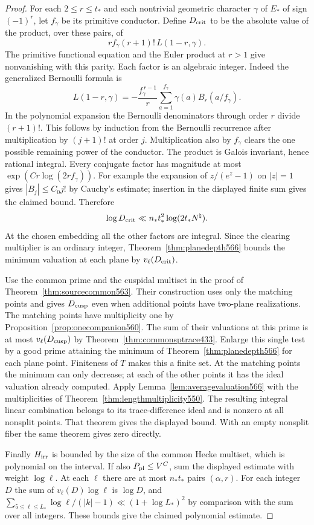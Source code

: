 \documentclass[a4paper,11pt]{article}
\theoremstyle{definition}
\theoremstyle{remark}
\numberwithin{equation}{section}
\begin{document}
\begin{proof}
For each \(2\le r\le t_*\) and each nontrivial geometric
character \(\gamma\) of \(E_*\) of sign \((-1)^r\), let
\(f_\gamma\) be its primitive conductor. Define \(D_{\rm crit}\)
to be the absolute value of the product, over these pairs, of
\[
                  r f_\gamma(r+1)!\,L(1-r,\gamma).
\]
The primitive functional equation and the Euler product at
\(r>1\) give nonvanishing with this parity. Each factor is an
algebraic integer. Indeed the generalized Bernoulli formula is
\[
       L(1-r,\gamma)=
       -\frac{f_\gamma^{\,r-1}}{r}
               \sum_{a=1}^{f_\gamma}\gamma(a)B_r(a/f_\gamma).
\]
In the polynomial expansion the Bernoulli denominators through
order \(r\) divide \((r+1)!\). This follows by induction from
the Bernoulli recurrence after multiplication by \((j+1)!\)
at order \(j\). Multiplication also by \(f_\gamma\) clears
the one possible remaining power of the conductor. The product
is Galois invariant, hence rational integral. Every conjugate
factor has magnitude at most \(\exp(Cr\log(2rf_\gamma))\).
For example the expansion of \(z/(e^z-1)\) on \(|z|=1\)
gives \(|B_j|\le C_0 j!\) by Cauchy's estimate; insertion in
the displayed finite sum gives the claimed bound. Therefore
\[
          \log D_{\rm crit}\ll n_*t_*^2\log(2t_*N^\natural).
\]
At the chosen embedding all the other factors are integral.
Since the clearing multiplier is an ordinary integer,
Theorem~\ref{thm:planedepth566} bounds the minimum valuation
at each plane by \(v_\ell(D_{\rm crit})\).

Use the common prime and the cuspidal multiset in the proof of
Theorem~\ref{thm:sourcecommon563}. Their construction uses
only the matching points and gives \(D_{\rm cusp}\) even
when additional points have two-plane realizations.
The matching points have multiplicity one by
Proposition~\ref{prop:onecompanion560}. The sum of their
valuations at this prime is at most \(v_\ell(D_{\rm cusp})\)
by Theorem~\ref{thm:commonsptrace433}. Enlarge this single
test by a good prime attaining the minimum of
Theorem~\ref{thm:planedepth566} for each plane point.
Finiteness of \(T\) makes this a finite set. At the matching
points the minimum can only decrease; at each of the other
points it has the ideal valuation already computed. Apply
Lemma~\ref{lem:averagevaluation566} with the multiplicities
of Theorem~\ref{thm:lengthmultiplicity550}. The resulting
integral linear combination belongs to its trace-difference
ideal and is nonzero at all nonsplit points. That theorem gives
the displayed bound. With an empty nonsplit fiber the same
theorem gives zero directly.

Finally \(H_{\rm irr}\) is bounded by the size of the common
Hecke multiset, which is polynomial on the interval. If also
\(P_{\rm pl}\le V^C\), sum the displayed estimate with weight
\(\log\ell\). At each \(\ell\) there are at most \(n_*t_*\)
pairs \((\alpha,r)\). For each integer \(D\) the sum of
\(v_\ell(D)\log\ell\) is \(\log D\), and
\(\sum_{5\le\ell\le L_*}\log\ell/(|k|-1)
\ll(1+\log L_*)^2\) by comparison with the sum over all
integers. These bounds give the claimed polynomial estimate.
\end{proof}
\end{document}
